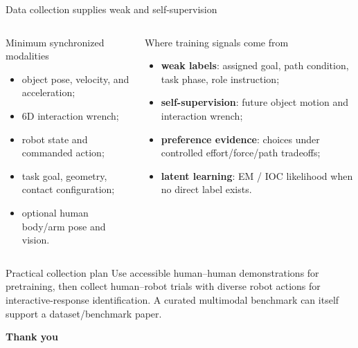 \documentclass[aspectratio=169,11pt]{beamer}
\begin{document}
\begin{frame}[shrink=5]{Data collection supplies weak and self-supervision}
\begin{columns}[T,onlytextwidth]
\begin{block}{Minimum synchronized modalities}
\begin{itemize}
  \item object pose, velocity, and acceleration;
  \item 6D interaction wrench;
  \item robot state and commanded action;
  \item task goal, geometry, contact configuration;
  \item optional human body/arm pose and vision.
\end{itemize}
\end{block}
\begin{block}{Where training signals come from}
\begin{itemize}
  \item \textbf{weak labels}: assigned goal, path condition, task phase, role instruction;
  \item \textbf{self-supervision}: future object motion and interaction wrench;
  \item \textbf{preference evidence}: choices under controlled effort/force/path tradeoffs;
  \item \textbf{latent learning}: EM / IOC likelihood when no direct label exists.
\end{itemize}
\end{block}
\end{columns}
\vspace{0.2cm}
\begin{alertblock}{Practical collection plan}
Use accessible human--human demonstrations for pretraining, then collect human--robot trials with diverse robot actions for interactive-response identification. A curated multimodal benchmark can itself support a dataset/benchmark paper.
\end{alertblock}
\end{frame}

{
\begin{frame}[plain]
\centering
\vfill
{\color{navy}\LARGE\bfseries Thank you}\par
\vspace{0.35cm}
\vfill
\end{frame}
}
\end{document}
